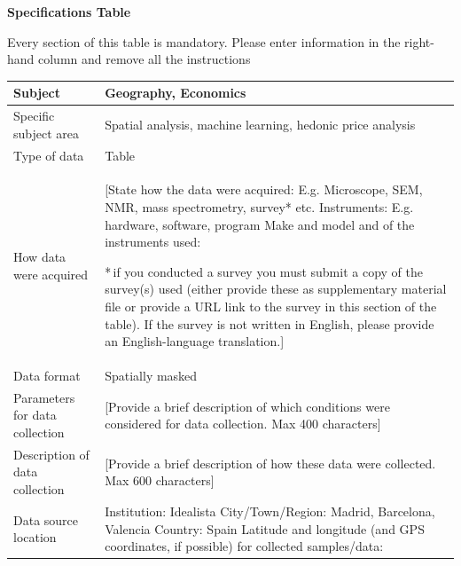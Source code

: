 \documentclass[times,final]{elsarticle}
\begin{document}
{\fontsize{7.5pt}{9pt}\selectfont
\noindent\textbf{Specifications Table}

Every section of this table is mandatory.
Please enter information in the right-hand column and remove all the instructions
\begin{longtable}{|p{33mm}|p{94mm}|}
\hline
\endhead
\hline
\endfoot
Subject                & Geography, Economics\\
\hline
Specific subject area  & Spatial analysis, machine learning, hedonic price analysis\\
\hline
Type of data           & Table\newline\\
How data were acquired & [State how the data were acquired: E.g. Microscope,
                         SEM, NMR, mass spectrometry, survey* etc.\newline
                         Instruments: E.g. hardware, software, program\newline
                         Make and model and of the instruments used:\newline

                         {\fontsize{7pt}{8pt}\selectfont
                         *\,if you conducted a survey you must submit a copy of the
                         survey(s) used (either provide these as supplementary material
                         file or provide a URL link to the survey
                         in this section of the table).
                         If the survey is not written in English,
                         please provide an English-language translation.}]\\
\hline
Data format            & Spatially masked\\
\hline
Parameters for
data\newline
collection             & [Provide a brief description of which conditions were considered
                         for data collection. Max 400 characters]\\

\hline
Description of
data\newline
collection             & [Provide a brief description of how these data were collected.
                         Max 600 characters]\\
\hline
Data source location   & Institution: Idealista\newline
                         City/Town/Region: Madrid, Barcelona, Valencia\newline
                         Country: Spain\newline
                         Latitude and longitude (and GPS coordinates, if possible) for collected samples/data:\newline



\end{longtable}}
\end{document}
